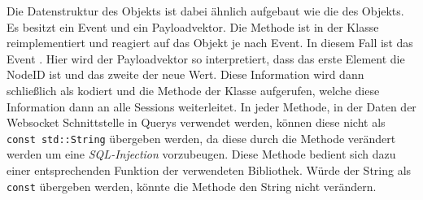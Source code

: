 Die Datenstruktur des  Objekts ist dabei ähnlich aufgebaut wie die des  Objekts.
Es besitzt ein Event und ein Payloadvektor.
Die Methode  ist in der Klasse  reimplementiert und reagiert auf das  Objekt je nach Event.
In diesem Fall ist das Event . Hier wird der Payloadvektor so interpretiert, dass das erste Element die NodeID ist und das zweite der neue Wert.
Diese Information wird dann schließlich als  kodiert und die Methode  der  Klasse aufgerufen, 
welche diese Information dann an alle Sessions weiterleitet.
In jeder Methode, in der Daten der Websocket Schnittstelle in Querys verwendet werden, können diese nicht als \glqq \texttt{const std::String}\grqq{} übergeben werden, da diese durch die Methode  verändert werden um eine \emph{SQL-Injection} vorzubeugen.
Diese Methode bedient sich dazu einer entsprechenden Funktion der verwendeten Bibliothek.
Würde der String als \glqq \texttt{const}\grqq{}  übergeben werden, könnte die Methode den String nicht verändern.



